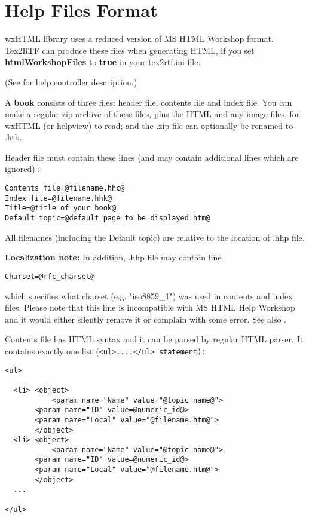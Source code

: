\section{Help Files Format}\label{helpformat}

wxHTML library uses a reduced version of MS HTML Workshop format.
Tex2RTF can produce these files when generating HTML, if you set {\bf htmlWorkshopFiles} to {\bf true} in
your tex2rtf.ini file.

(See  for help controller description.)

A {\bf book} consists of three files: header file, contents file and index file.
You can make a regular zip archive of these files, plus the HTML and any image files,
for wxHTML (or helpview) to read; and the .zip file can optionally be renamed to .htb.


Header file must contain these lines (and may contain additional lines which are ignored) :

\begin{verbatim}
Contents file=@filename.hhc@
Index file=@filename.hhk@
Title=@title of your book@
Default topic=@default page to be displayed.htm@
\end{verbatim}

All filenames (including the Default topic) are relative to the 
location of .hhp file.

{\bf Localization note:} In addition, .hhp file may contain line

\begin{verbatim}
Charset=@rfc_charset@
\end{verbatim}

which specifies what charset (e.g. "iso8859\_1") was used in contents
and index files. Please note that this line is incompatible with
MS HTML Help Workshop and it would either silently remove it or complain
with some error. See also 
.


Contents file has HTML syntax and it can be parsed by regular HTML parser. It contains exactly one list
(\tt{<ul>}....\tt{</ul>} statement):

\begin{verbatim}
<ul>

  <li> <object>
           <param name="Name" value="@topic name@">
	   <param name="ID" value=@numeric_id@>
	   <param name="Local" value="@filename.htm@">
       </object>
  <li> <object>
           <param name="Name" value="@topic name@">
	   <param name="ID" value=@numeric_id@>
	   <param name="Local" value="@filename.htm@">
       </object>
  ...    

</ul>
\end{verbatim}

